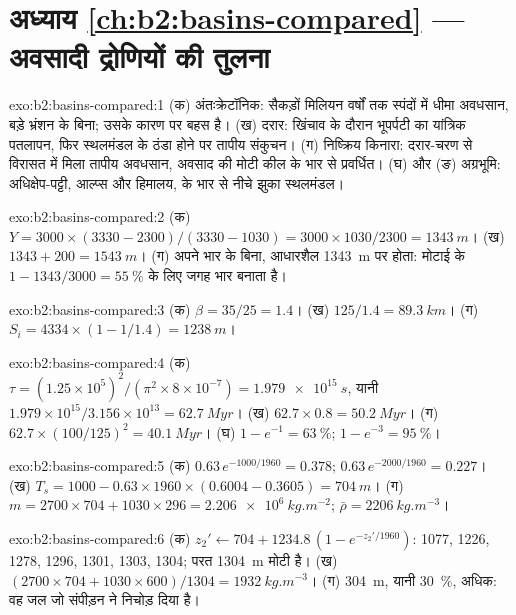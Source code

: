 \section*{अध्याय \ref{ch:b2:basins-compared} --- अवसादी द्रोणियों की तुलना}

\begin{solution}{exo:b2:basins-compared:1}
(क) अंतःक्रेटॉनिक: सैकड़ों मिलियन वर्षों तक स्पंदों में धीमा अवधसान, बड़े
भ्रंशन के बिना; उसके कारण पर बहस है। (ख) दरार: खिंचाव के दौरान भूपर्पटी का यांत्रिक पतलापन,
फिर स्थलमंडल के ठंडा होने पर तापीय संकुचन। (ग) निष्क्रिय किनारा: दरार-चरण से विरासत में मिला
तापीय अवधसान, अवसाद की मोटी कील के भार से प्रवर्धित। (घ) और (ङ)
अग्रभूमि: अधिक्षेप-पट्टी, आल्प्स और हिमालय, के भार से नीचे झुका स्थलमंडल।
\end{solution}

\begin{solution}{exo:b2:basins-compared:2}
(क) $Y = 3000\times(3330 - 2300)/(3330 - 1030) = 3000\times1030/2300 = \qty{1343}{m}$।
(ख) $1343 + 200 = \qty{1543}{m}$। (ग) अपने भार के बिना, आधारशैल \qty{1343}{m} पर होता:
मोटाई के $1 - 1343/3000 = \qty{55}{\percent}$ के लिए जगह भार बनाता है।
\end{solution}

\begin{solution}{exo:b2:basins-compared:3}
(क) $\beta = 35/25 = 1.4$। (ख) $125/1.4 = \qty{89.3}{km}$। (ग) $S_i = 4334\times(1 - 1/1.4) =
\qty{1238}{m}$।
\end{solution}

\begin{solution}{exo:b2:basins-compared:4}
(क) $\tau = (1.25\times10^{5})^2/(\pi^2\times8\times10^{-7}) = \qty{1.979e15}{s}$, यानी
$1.979\times10^{15}/3.156\times10^{13} = \qty{62.7}{Myr}$। (ख) $62.7\times0.8 = \qty{50.2}{Myr}$।
(ग) $62.7\times(100/125)^2 = \qty{40.1}{Myr}$। (घ) $1 - e^{-1} = \qty{63}{\percent}$; $1 -
e^{-3} = \qty{95}{\percent}$।
\end{solution}

\begin{solution}{exo:b2:basins-compared:5}
(क) $0.63\,e^{-1000/1960} = 0.378$; $0.63\,e^{-2000/1960} = 0.227$। (ख) $T_s = 1000 -
0.63\times1960\times(0.6004 - 0.3605) = \qty{704}{m}$। (ग) $m = 2700\times704 + 1030\times296 =
\qty{2.206e6}{kg.m^{-2}}$; $\bar\rho = \qty{2206}{kg.m^{-3}}$।
\end{solution}

\begin{solution}{exo:b2:basins-compared:6}
(क) $z_2' \leftarrow 704 + 1234.8\,(1 - e^{-z_2'/1960})$: 1077, 1226, 1278, 1296, 1301, 1303,
1304; परत \qty{1304}{m} मोटी है। (ख) $(2700\times704 + 1030\times600)/1304 =
\qty{1932}{kg.m^{-3}}$। (ग) \qty{304}{m}, यानी \qty{30}{\percent}, अधिक: वह जल जो संपीड़न ने
निचोड़ दिया है।
\end{solution}

